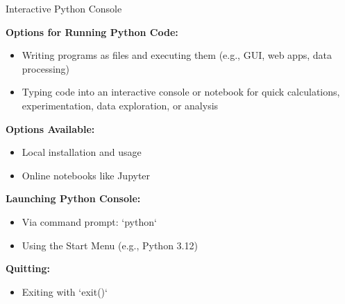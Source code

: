 \documentclass[
	11pt, 
]{beamer}
\begin{document}
\begin{frame}{Interactive Python Console}

\textbf{Options for Running Python Code:}
    \begin{itemize}
        \item Writing programs as files and executing them (e.g., GUI, web apps, data processing)
        \item Typing code into an interactive console or notebook for quick calculations, experimentation, data exploration, or analysis
    \end{itemize} \smallskip


\textbf{Options Available:}
    \begin{itemize}
        \item Local installation and usage
        \item Online notebooks like Jupyter
    \end{itemize} \smallskip

\textbf{Launching Python Console:}
    \begin{itemize}
        \item Via command prompt: `python`
        \item Using the Start Menu (e.g., Python 3.12)
    \end{itemize} \smallskip
    
\textbf{Quitting:}
    \begin{itemize}
        \item Exiting with `exit()`
    \end{itemize}
\end{frame} 

\end{document}
